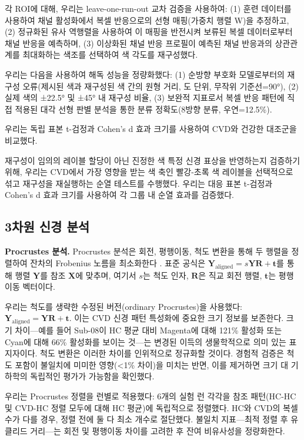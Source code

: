 \documentclass[12pt,a4paper]{article}
\begin{document}
각 ROI에 대해, 우리는 leave-one-run-out 교차 검증을 사용하여: (1) 훈련 데이터를 사용하여 채널 활성화에서 복셀 반응으로의 선형 매핑(가중치 행렬 W)을 추정하고, (2) 정규화된 유사 역행렬을 사용하여 이 매핑을 반전시켜 보류된 복셀 데이터로부터 채널 반응을 예측하며, (3) 이상화된 채널 반응 프로필이 예측된 채널 반응과의 상관관계를 최대화하는 색조를 선택하여 색 각도를 재구성했다.

우리는 다음을 사용하여 해독 성능을 정량화했다: (1) 순방향 부호화 모델로부터의 재구성 오류(제시된 색과 재구성된 색 간의 원형 거리, 도 단위, 무작위 기준선=90°), (2) 실제 색의 ±22.5° 및 ±45° 내 재구성 비율, (3) 보완적 지표로서 복셀 반응 패턴에 직접 적용된 대각 선형 판별 분석을 통한 분류 정확도(8방향 분류, 우연=12.5\%).

우리는 독립 표본 t-검정과 Cohen's d 효과 크기를 사용하여 CVD와 건강한 대조군을 비교했다.

재구성이 임의의 레이블 할당이 아닌 진정한 색 특정 신경 표상을 반영하는지 검증하기 위해, 우리는 CVD에서 가장 영향을 받는 색 축인 빨강-초록 색 레이블을 선택적으로 섞고 재구성을 재실행하는 순열 테스트를 수행했다. 우리는 대응 표본 t-검정과 Cohen's d 효과 크기를 사용하여 각 그룹 내 순열 효과를 검증했다.

\subsection{3차원 신경 분석}

\textbf{Procrustes 분석.} Procrustes 분석은 회전, 평행이동, 척도 변환을 통해 두 행렬을 정렬하여 잔차의 Frobenius 노름을 최소화한다 \parencite{Gower1975}. 표준 공식은 $\mathbf{Y}_{\text{aligned}} = s\mathbf{Y}\mathbf{R} + \mathbf{t}$를 통해 행렬 $\mathbf{Y}$를 참조 $\mathbf{X}$에 맞추며, 여기서 $s$는 척도 인자, $\mathbf{R}$은 직교 회전 행렬, $\mathbf{t}$는 평행이동 벡터이다.

우리는 척도를 생략한 수정된 버전(ordinary Procrustes)을 사용했다: $\mathbf{Y}_{\text{aligned}} = \mathbf{Y}\mathbf{R} + \mathbf{t}$. 이는 CVD 신경 패턴 특성화에 중요한 크기 정보를 보존한다. 크기 차이—예를 들어 Sub-08이 HC 평균 대비 Magenta에 대해 121\% 활성화 또는 Cyan에 대해 66\% 활성화를 보이는 것—는 변경된 이득의 생물학적으로 의미 있는 표지자이다. 척도 변환은 이러한 차이를 인위적으로 정규화할 것이다. 경험적 검증은 척도 포함이 불일치에 미미한 영향(<1\% 차이)을 미치는 반면, 이를 제거하면 크기 대 기하학의 독립적인 평가가 가능함을 확인했다.

우리는 Procrustes 정렬을 런별로 적용했다: 6개의 실험 런 각각을 참조 패턴(HC-HC 및 CVD-HC 정렬 모두에 대해 HC 평균)에 독립적으로 정렬했다. HC와 CVD의 복셀 수가 다를 경우, 정렬 전에 둘 다 최소 개수로 절단했다. 불일치 지표—최적 정렬 후 유클리드 거리—는 회전 및 평행이동 차이를 고려한 후 잔여 비유사성을 정량화한다.
\end{document}
